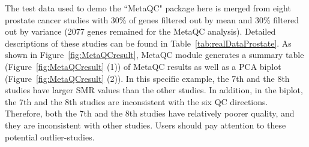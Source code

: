 The test data used to demo the ``MetaQC" package here is merged from eight prostate cancer studies with 30\% of genes filtered out by mean and 30\% filtered out by variance (2077 genes remained for the MetaQC analysis). 
Detailed descriptions of these studies can be found in Table~\ref{tab:realDataProstate}. 
As shown in Figure~\ref{fig:MetaQCresult}, 
MetaQC module generates a summary table (Figure~\ref{fig:MetaQCresult} {\color{red} (1)}) of MetaQC results 
as well as a PCA biplot (Figure~\ref{fig:MetaQCresult}  {\color{red} (2)}). 
In this specific example, the 7th and the 8th studies have larger SMR values than the other studies.
In addition, in the biplot,  the 7th and the 8th studies are inconsistent with the six QC directions.
Therefore, both the 7th and the 8th studies have relatively poorer quality, and they are inconsistent with other studies.
Users should pay attention to these potential outlier-studies.


